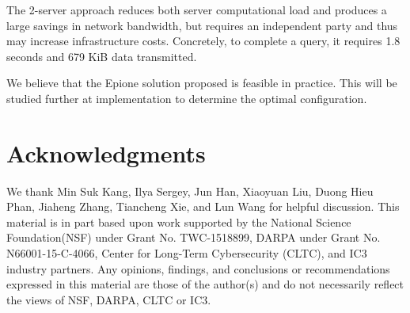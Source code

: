 \documentclass[11pt]{article} %
\newcommand{\dect}{\textsf{Epione}\xspace}
\newcommand{\remove}[1]{}
\begin{document}
The 2-server approach reduces both server computational load and produces a large savings in network bandwidth, but requires an independent party and thus may increase infrastructure costs. Concretely, to complete a query, it requires 1.8 seconds and 679 KiB data transmitted.

\remove{Alternatively, the number of database shards can be increased. This does reveal slightly more information about the client's tokens to the server, but this may be acceptable depending on the number of tokens and performance requirements.}

We believe that the \dect solution proposed is feasible in practice. This will be studied further at implementation to determine the optimal configuration. 

\remove{
	Compared to other system in Table~\ref{tbl:comp-complx}:
	\begin{itemize}
		\item Baseline system (these designs make public notifications): Downloading $N$ new tokens of users diagnosed, each token of size 128 bits, requires 89.6MB.
		\item PACT\cite{chan2020pact}, client exchanges $2\times 80$ group elements at contact event, and receives $2N$ group elements from the server. Each group element has 256 bits. Therefore, the communication cost of PACT's client is 358.4MB. 
	\end{itemize}
}



\section*{Acknowledgments}
We thank Min Suk Kang, Ilya Sergey, Jun Han, Xiaoyuan Liu, Duong Hieu Phan, Jiaheng Zhang, Tiancheng Xie, and Lun Wang for helpful discussion.  This material is in part based upon work supported by the National Science Foundation(NSF) under Grant No. TWC-1518899, DARPA under Grant No. N66001-15-C-4066, Center for Long-Term Cybersecurity (CLTC), and IC3 industry partners. Any opinions, findings, and conclusions or recommendations expressed in this material are those of the author(s) and do not necessarily reflect the views of NSF, DARPA, CLTC or IC3.


%	 
\end{document}
